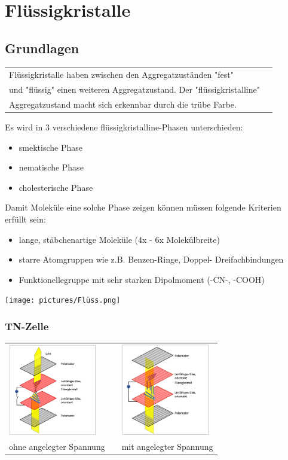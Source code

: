 \section{Flüssigkristalle}


\subsection{Grundlagen}

    \begin{tabular}{ll} 
        Flüssigkristalle haben zwischen den Aggregatzuständen "fest" \\  und "flüssig" einen weiteren Aggregatzustand. Der "flüssigkristalline" \\ Aggregatzustand macht sich erkennbar durch die trübe Farbe.        
    \end{tabular}
    Es wird in 3 verschiedene flüssigkristalline-Phasen unterschieden:
    \begin{itemize}
        \item smektische Phase
        \item nematische Phase
        \item cholesterische Phase
    \end{itemize}
    Damit Moleküle eine solche Phase zeigen können müssen folgende Kriterien erfüllt sein:
    \begin{itemize}
        \item lange, stäbchenartige Moleküle (4x - 6x Molekülbreite)
        \item starre Atomgruppen wie z.B. Benzen-Ringe, Doppel- Dreifachbindungen
        \item Funktionellegruppe mit sehr starken Dipolmoment (-CN-, -COOH)
    \end{itemize}
    \begin{center}
        \texttt{[image: pictures/Flüss.png]}
    \end{center}


    \subsubsection{TN-Zelle}
        \begin{tabular}{lll}
            \includegraphics[height=4cm]{pictures/TN-Zelle1.png} & &   \includegraphics[height=4cm]{pictures/TN-Zelle2.png} \\
            ohne angelegter Spannung  & &  mit angelegter Spannung 
        \end{tabular}
